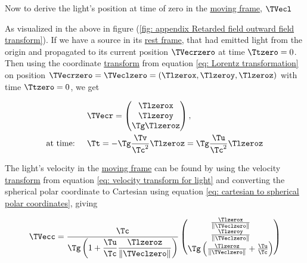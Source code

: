 Now to derive the light's position at time of zero in the \hyperlink{def-Moving-Frame}{moving frame}, $\TVecl $

\begin{derivation}

	As visualized in the above in figure (\ref{fig: appendix Retarded field outward field transform}).
	If we have a source in its \hyperlink{def-proper-frame}{rest frame}, that had emitted light from the origin and propagated to its current position $\TVecrzero $ at time ${\Ttzero } = 0$.
	Then using the coordinate \hyperlink{def-transform}{transform} from equation \eqref{eq: Lorentz transformation} on position $\TVecrzero =\TVeclzero =(\Tlzerox ,\Tlzeroy ,\Tlzeroz )$ with time ${\Ttzero } = 0$, we get

	\begin{equation}
		\label{eq: displacement transform}
		\begin{aligned}
			&\TVecr   =
			\begin{pmatrix}
				\Tlzerox           \\
				\Tlzeroy           \\
				{\Tg } \Tlzeroz  \\
			\end{pmatrix},                                                                         \\
			\text{at time: }\quad& {\Tt }=-{\Tg } \frac{ \Tv  }{ \Tc ^2}{\Tlzeroz  } = \Tg  \frac{\Tu }{ \Tc ^2}{\Tlzeroz  } \\
		\end{aligned}
	\end{equation}

	The light's velocity in the \hyperlink{def-Moving-Frame}{moving frame} can be found by using the velocity \hyperlink{def-transform}{transform} from equation \eqref{eq: velocity transform for light} and converting the spherical polar coordinate to Cartesian using equation \eqref{eq: cartesian to spherical polar coordinates}, giving

	\begin{equation}
		\label{eq: light pulse velocity transform}
		\TVecc  =
		\dfrac{\Tc }{\Tg  \left(1 + \dfrac{\Tu }{\Tc } \dfrac{\Tlzeroz  }{\|\TVeclzero \|} \right)}
		\begin{pmatrix}
			\frac{\Tlzerox  }{\|\TVeclzero \|}                                      \\
			\frac{\Tlzeroy  }{\|\TVeclzero \|}                                      \\
			\Tg  \left( \frac{\Tlzeroz  }{\|\TVeclzero \|} + \frac{\Tu }{\Tc }  \right) \\
		\end{pmatrix}
	\end{equation}


\end{derivation}
